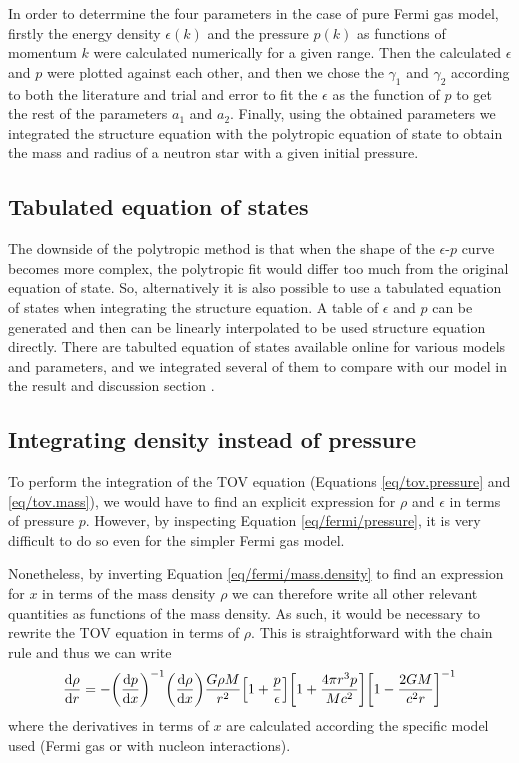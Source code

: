 \documentclass[draft,11pt]{article}
\theoremstyle{definition}
\theoremstyle{remark}
\begin{document}
            In order to deterrmine the four parameters in the case of pure Fermi gas model, firstly the energy density $\epsilon(k)$ and the pressure $p(k)$ as functions of momentum $k$ were calculated numerically for a given range. Then the calculated $\epsilon$ and $p$ were plotted against each other, and then we chose the $\gamma_1$ and $\gamma_2$ according to both the literature and trial and error to fit the $\epsilon$ as the function of $p$ to get the rest of the parameters $a_1$ and $a_2$. Finally, using the obtained parameters we integrated the structure equation with the polytropic equation of state to obtain the mass and radius of a neutron star with a given initial pressure.

        \subsection{Tabulated equation of states}
            The downside of the polytropic method is that when the shape of the $\epsilon$-$p$ curve becomes more complex, the polytropic fit would differ too much from the original equation of state. So, alternatively it is also possible to use a tabulated equation of states when integrating the structure equation. A table of $\epsilon$ and $p$ can be generated and then can be linearly interpolated to be used structure equation directly. There are tabulted equation of states available online for various models and parameters, and we integrated several of them to compare with our model in the result and discussion section \cite{arizona/eos.table}.

        \subsection{Integrating density instead of pressure}
            To perform the integration of the TOV equation (Equations \ref{eq/tov.pressure} and \ref{eq/tov.mass}), we would have to find an explicit expression for $\rho$ and $\epsilon$ in terms of pressure $p$. However, by inspecting Equation \ref{eq/fermi/pressure}, it is very difficult to do so even for the simpler Fermi gas model.
            
            Nonetheless, by inverting Equation \ref{eq/fermi/mass.density} to find an expression for $x$ in terms of the mass density $\rho$ we can therefore write all other relevant quantities as functions of the mass density. As such, it would be necessary to rewrite the TOV equation in terms of $\rho$. This is straightforward with the chain rule and thus we can write \begin{equation}\label{eq/tov.density}\dv{\rho}{r}=-\qty(\dv{p}{x})^{-1}\qty(\dv{\rho}{x})\frac{G\rho M}{r^{2}}\qty[1+\frac{p}{\epsilon}]\qty[1+\frac{4\pi r^{3}p}{Mc^{2}}]\qty[1-\frac{2GM}{c^{2}r}]^{-1}\end{equation} where the derivatives in terms of $x$ are calculated according the specific model used (Fermi gas or with nucleon interactions).
            
\end{document}
